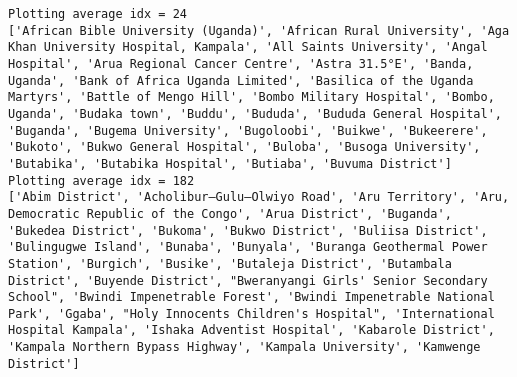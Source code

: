 \documentclass[11pt]{article}
\begin{document}
    \begin{Verbatim}[commandchars=\\\{\}]
Plotting average idx = 24
['African Bible University (Uganda)', 'African Rural University', 'Aga Khan University Hospital, Kampala', 'All Saints University', 'Angal Hospital', 'Arua Regional Cancer Centre', 'Astra 31.5°E', 'Banda, Uganda', 'Bank of Africa Uganda Limited', 'Basilica of the Uganda Martyrs', 'Battle of Mengo Hill', 'Bombo Military Hospital', 'Bombo, Uganda', 'Budaka town', 'Buddu', 'Bududa', 'Bududa General Hospital', 'Buganda', 'Bugema University', 'Bugoloobi', 'Buikwe', 'Bukeerere', 'Bukoto', 'Bukwo General Hospital', 'Buloba', 'Busoga University', 'Butabika', 'Butabika Hospital', 'Butiaba', 'Buvuma District']
Plotting average idx = 182
['Abim District', 'Acholibur–Gulu–Olwiyo Road', 'Aru Territory', 'Aru, Democratic Republic of the Congo', 'Arua District', 'Buganda', 'Bukedea District', 'Bukoma', 'Bukwo District', 'Buliisa District', 'Bulingugwe Island', 'Bunaba', 'Bunyala', 'Buranga Geothermal Power Station', 'Burgich', 'Busike', 'Butaleja District', 'Butambala District', 'Buyende District', "Bweranyangi Girls' Senior Secondary School", 'Bwindi Impenetrable Forest', 'Bwindi Impenetrable National Park', 'Ggaba', "Holy Innocents Children's Hospital", 'International Hospital Kampala', 'Ishaka Adventist Hospital', 'Kabarole District', 'Kampala Northern Bypass Highway', 'Kampala University', 'Kamwenge District']

    \end{Verbatim}

    \begin{center}
    \end{center}
    { \hspace*{\fill} \\}
    
    \begin{center}
    \end{center}
    { \hspace*{\fill} \\}
    
\end{document}

